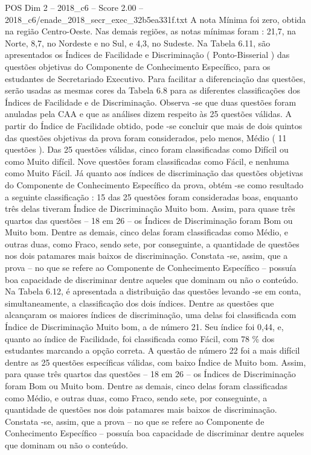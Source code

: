 \begin{textsample}{POS Dim 2 – 2018\_c6 – Score 2.00 – 2018\_c6/enade\_2018\_secr\_exec\_32b5ea331f.txt}
A nota Mínima foi zero, obtida na região Centro-Oeste.
Nas demais regiões, as notas mínimas foram : 21,7, na Norte, 8,7, no Nordeste e no Sul, e 4,3, no Sudeste.
Na Tabela 6.11, são apresentados os Índices de Facilidade e Discriminação ( Ponto-Bisserial ) das questões objetivas do Componente de Conhecimento Específico, para os estudantes de Secretariado Executivo.
Para facilitar a diferenciação das questões, serão usadas as mesmas cores da Tabela 6.8 para as diferentes classificações dos Índices de Facilidade e de Discriminação.
Observa -se que duas questões foram anuladas pela CAA e que as análises dizem respeito às 25 questões válidas.
A partir do Índice de Facilidade obtido, pode -se concluir que mais de dois quintos das questões objetivas da prova foram considerados, pelo menos, Médio ( 11 questões ).
Das 25 questões válidas, cinco foram classificadas como Difícil ou como Muito difícil.
Nove questões foram classificadas como Fácil, e nenhuma como Muito Fácil.
Já quanto aos índices de discriminação das questões objetivas do Componente de Conhecimento Específico da prova, obtém -se como resultado a seguinte classificação : 15 das 25 questões foram consideradas boas, enquanto três delas tiveram Índice de Discriminação Muito bom.
Assim, para quase três quartos das questões – 18 em 26 – os Índices de Discriminação foram Bom ou Muito bom.
Dentre as demais, cinco delas foram classificadas como Médio, e outras duas, como Fraco, sendo sete, por conseguinte, a quantidade de questões nos dois patamares mais baixos de discriminação.
Constata -se, assim, que a prova – no que se refere ao Componente de Conhecimento Específico – possuía boa capacidade de discriminar dentre aqueles que dominam ou não o conteúdo.
Na Tabela 6.12, é apresentada a distribuição das questões levando -se em conta, simultaneamente, a classificação dos dois índices.
Dentre as questões que alcançaram os maiores índices de discriminação, uma delas foi classificada com Índice de Discriminação Muito bom, a de número 21.
Seu índice foi 0,44, e, quanto ao índice de Facilidade, foi classificada como Fácil, com 78 \% dos estudantes marcando a opção correta.
A questão de número 22 foi a mais difícil dentre as 25 questões específicas válidas, com baixo Índice de Muito bom.
Assim, para quase três quartos das questões – 18 em 26 – os Índices de Discriminação foram Bom ou Muito bom.
Dentre as demais, cinco delas foram classificadas como Médio, e outras duas, como Fraco, sendo sete, por conseguinte, a quantidade de questões nos dois patamares mais baixos de discriminação.
Constata -se, assim, que a prova – no que se refere ao Componente de Conhecimento Específico – possuía boa capacidade de discriminar dentre aqueles que dominam ou não o conteúdo.

\end{textsample}
